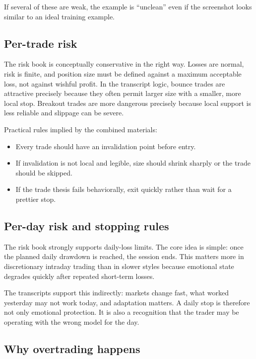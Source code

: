 If several of these are weak, the example is ``unclean'' even if the screenshot looks similar to
an ideal training example.

\subsection{Per-trade risk}

The risk book is conceptually conservative in the right way. Losses are normal, risk is finite,
and position size must be defined against a maximum acceptable loss, not against wishful profit.
In the transcript logic, bounce trades are attractive precisely because they often permit larger
size with a smaller, more local stop. Breakout trades are more dangerous precisely because local
support is less reliable and slippage can be severe.

Practical rules implied by the combined materials:

\begin{itemize}[leftmargin=1.4em]
  \item Every trade should have an invalidation point before entry.
  \item If invalidation is not local and legible, size should shrink sharply or the trade should be
        skipped.
  \item If the trade thesis fails behaviorally, exit quickly rather than wait for a prettier stop.
\end{itemize}

\subsection{Per-day risk and stopping rules}

The risk book strongly supports daily-loss limits. The core idea is simple: once the planned
daily drawdown is reached, the session ends. This matters more in discretionary intraday trading
than in slower styles because emotional state degrades quickly after repeated short-term losses.

The transcripts support this indirectly: markets change fast, what worked yesterday may not work
today, and adaptation matters. A daily stop is therefore not only emotional protection. It is
also a recognition that the trader may be operating with the wrong model for the day.

\subsection{Why overtrading happens}

